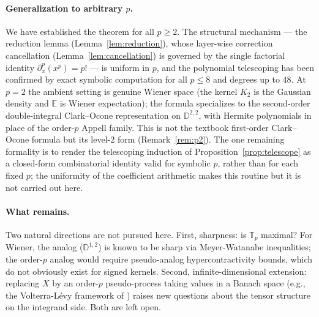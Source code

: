\documentclass[11pt,reqno]{amsart}
\theoremstyle{plain}
\theoremstyle{definition}
\newcommand{\E}{\mathbb{E}}
\begin{document}
\paragraph{Generalization to arbitrary $p$.}
We have established the theorem for all $p \geq 2$. The structural mechanism --- the reduction lemma (Lemma~\ref{lem:reduction}), whose layer-wise correction cancellation (Lemma~\ref{lem:cancellation}) is governed by the single factorial identity $\partial_x^p(x^p)=p!$ --- is uniform in $p$, and the polynomial telescoping has been confirmed by exact symbolic computation for all $p \leq 8$ and degrees up to $48$. At $p=2$ the ambient setting is genuine Wiener space (the kernel $K_2$ is the Gaussian density and $\E$ is Wiener expectation); the formula specializes to the second-order double-integral Clark--Ocone representation on $\mathbb{D}^{2,2}$, with Hermite polynomials in place of the order-$p$ Appell family. This is not the textbook first-order Clark--Ocone formula but its level-2 form (Remark~\ref{rem:p2}). The one remaining formality is to render the telescoping induction of Proposition~\ref{prop:telescope} as a closed-form combinatorial identity valid for symbolic $p$, rather than for each fixed $p$; the uniformity of the coefficient arithmetic makes this routine but it is not carried out here.

\paragraph{What remains.}
Two natural directions are not pursued here. First, sharpness: is $\mathbb{T}_p$ maximal? For Wiener, the analog ($\mathbb{D}^{1,2}$) is known to be sharp via Meyer-Watanabe inequalities; the order-$p$ analog would require pseudo-analog hypercontractivity bounds, which do not obviously exist for signed kernels. Second, infinite-dimensional extension: replacing $X$ by an order-$p$ pseudo-process taking values in a Banach space (e.g., the Volterra-Lévy framework of \cite{operatorDerivativeI}) raises new questions about the tensor structure on the integrand side. Both are left open.
\end{document}
